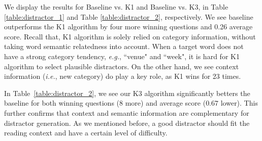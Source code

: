 We display the results for Baseline vs. K1 and Baseline vs. K3, in  
Table \ref{table:distractor_1} and Table \ref{table:distractor_2}, respectively.  We see baseline outperforms the K1 algorithm by four more winning questions and 0.26 average score. Recall that, K1 algorithm is solely relied on category information, without taking word semantic relatedness into account. When a target word does not have a strong category tendency, {\it e.g.}, ``venue" and ``week", it is hard for K1 algorithm to select plausible distractors. On the other hand, we see context information ({\it i.e.}, new category) do play a key role, as K1 wins for 23 times.


In Table~\ref{table:distractor_2}, we see our K3 algorithm significantly betters the baseline for both winning questions (8 more) and average score ($0.67$ lower). This further confirms that context and semantic information are complementary for distractor generation. As we mentioned before, a good distractor should fit the reading context and have a certain level of difficulty.
 
 






